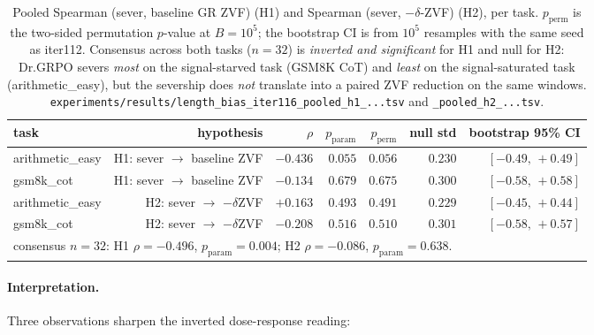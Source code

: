 \begin{table}[t]
\centering
\small
\setlength{\tabcolsep}{5pt}
\begin{tabular}{l r r r r r r}
\hline
task & hypothesis & $\rho$ & $p_{\mathrm{param}}$ &
$p_{\mathrm{perm}}$ & null std & bootstrap 95\% CI \\
\hline
arithmetic\_easy & H1: sever $\to$ baseline ZVF & $-0.436$ & $0.055$ &
$0.056$ & $0.230$ & $[-0.49,\,+0.49]$ \\
gsm8k\_cot       & H1: sever $\to$ baseline ZVF & $-0.134$ & $0.679$ &
$0.675$ & $0.300$ & $[-0.58,\,+0.58]$ \\
arithmetic\_easy & H2: sever $\to$ $-\delta$ZVF & $+0.163$ & $0.493$ &
$0.491$ & $0.229$ & $[-0.45,\,+0.44]$ \\
gsm8k\_cot       & H2: sever $\to$ $-\delta$ZVF & $-0.208$ & $0.516$ &
$0.510$ & $0.301$ & $[-0.58,\,+0.57]$ \\
\hline
\multicolumn{7}{l}{consensus $n{=}32$: H1 $\rho=-0.496$, $p_{\mathrm{param}}{=}0.004$; H2 $\rho=-0.086$, $p_{\mathrm{param}}{=}0.638$.}
\end{tabular}
\caption{Pooled Spearman (sever, baseline GR ZVF) (H1) and
Spearman (sever, $-\delta$-ZVF) (H2), per task.
$p_{\mathrm{perm}}$ is the two-sided permutation $p$-value at
$B{=}10^{5}$; the bootstrap CI is from $10^{5}$ resamples with the
same seed as iter112.  Consensus across both tasks ($n{=}32$) is
\emph{inverted and significant} for H1 and null for H2:
Dr.GRPO severs \emph{most} on the signal-starved task (GSM8K CoT)
and \emph{least} on the signal-saturated task (arithmetic\_easy),
but the severship does \emph{not} translate into a paired ZVF
reduction on the same windows.
\texttt{experiments/results/length\_bias\_iter116\_pooled\_h1\_...tsv}
and \texttt{\_pooled\_h2\_...tsv}.}
\label{tab:length-bias-iter116-pooled}
\end{table}

\paragraph{Interpretation.}
Three observations sharpen the inverted dose-response reading:

